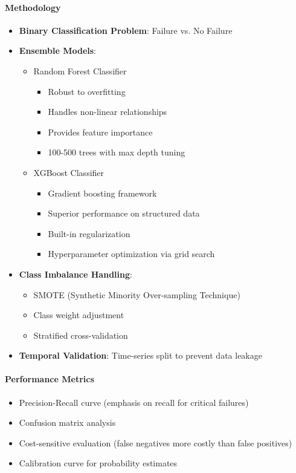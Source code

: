\documentclass[12pt,a4paper]{article}
\begin{document}
\paragraph{Methodology}
\begin{itemize}[leftmargin=*]
    \item \textbf{Binary Classification Problem}: Failure vs. No Failure
    \item \textbf{Ensemble Models}:
    \begin{itemize}
        \item Random Forest Classifier
        \begin{itemize}
            \item Robust to overfitting
            \item Handles non-linear relationships
            \item Provides feature importance
            \item 100-500 trees with max depth tuning
        \end{itemize}
        \item XGBoost Classifier
        \begin{itemize}
            \item Gradient boosting framework
            \item Superior performance on structured data
            \item Built-in regularization
            \item Hyperparameter optimization via grid search
        \end{itemize}
    \end{itemize}
    \item \textbf{Class Imbalance Handling}:
    \begin{itemize}
        \item SMOTE (Synthetic Minority Over-sampling Technique)
        \item Class weight adjustment
        \item Stratified cross-validation
    \end{itemize}
    \item \textbf{Temporal Validation}: Time-series split to prevent data leakage
\end{itemize}

\paragraph{Performance Metrics}
\begin{itemize}[leftmargin=*]
    \item Precision-Recall curve (emphasis on recall for critical failures)
    \item Confusion matrix analysis
    \item Cost-sensitive evaluation (false negatives more costly than false positives)
    \item Calibration curve for probability estimates
\end{itemize}
\end{document}
